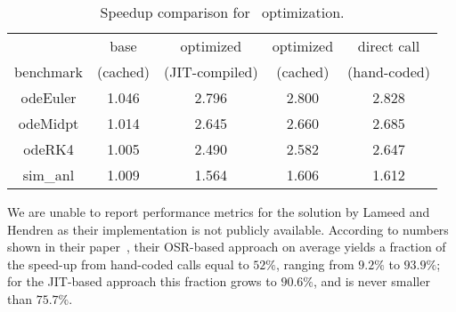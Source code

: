 \begin{table}
    \begin{tabular}{ |c|c|c|c|c| }
        \hline
         & base & optimized & optimized & direct call \\ 
        benchmark & (cached) & (JIT-compiled) & (cached) & (hand-coded) \\
        \hline
        \hline
        odeEuler & 1.046 & 2.796 & 2.800 & 2.828 \\ 
        \hline
        odeMidpt & 1.014 & 2.645 & 2.660 & 2.685 \\ 
        \hline
        odeRK4 & 1.005 & 2.490 & 2.582 & 2.647 \\ 
        \hline
        sim_anl & 1.009 & 1.564 & 1.606 & 1.612 \\ 
        \hline
    \end{tabular} 
    \caption{\label{tab:feval} Speedup comparison for \feval\ optimization.} 
\end{table}  
  
We are unable to report performance metrics for the solution by Lameed and Hendren as their implementation is not publicly available. According to numbers shown in their paper~\cite{lameed2013feval}, their OSR-based approach on average yields a fraction of the speed-up from hand-coded calls equal to $52\%$, ranging from $9.2\%$ to $93.9\%$; for the JIT-based approach this fraction grows to $90.6\%$, and is never smaller than $75.7\%$.
  
  
  
  
  
  
  
  
  
  
  
  
  
  
  
  